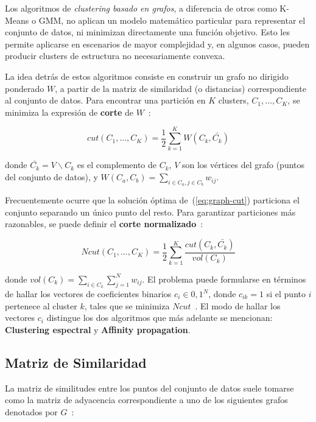Los algoritmos de \textit{clustering basado en grafos}, a diferencia de otros como K-Means o GMM, no aplican un modelo matemático particular para representar el conjunto de datos, ni minimizan directamente una función objetivo.
Esto les permite aplicarse en escenarios de mayor complejidad y, en algunos casos, pueden producir clusters de estructura no necesariamente convexa.

La idea detrás de estos algoritmos consiste en construir un grafo no dirigido ponderado $W$, a partir de la matriz de similaridad (o distancias) correspondiente al conjunto de datos.
Para encontrar una partición en $K$ clusters, $C_1,\dots,C_K$, se minimiza la expresión de \textbf{corte} de $W$~\cite{Murphy12}:

\begin{equation}
    \label{eq:graph-cut}
    cut(C_1,\dots,C_K) = \frac{1}{2}\sum_{k=1}^{K}{W(C_k,\bar{C_k})}
\end{equation}

\noindent
donde $\bar{C_k}=V\backslash C_k$ es el complemento de $C_k$, $V$ son los vértices del grafo (puntos del conjunto de datos), y $W(C_a,C_b) = \sum_{i\in C_a, j \in C_b}{w_{ij}}$.

Frecuentemente ocurre que la solución óptima de~(\ref{eq:graph-cut}) particiona el conjunto separando un único punto del resto.
Para garantizar particiones más razonables, se puede definir el \textbf{corte normalizado}~\cite{Murphy12}:

\begin{equation}
    \label{eq:normalized-cut}
    Ncut(C_1,\dots,C_K) = \frac{1}{2}\sum_{k=1}^{K}{\frac{cut(C_k,\bar{C_k})}{vol(C_k)}}
\end{equation}

\noindent
donde $vol(C_k)=\sum_{i\in C_k}\sum_{j=1}^{N}{w_{ij}}$.
El problema puede formularse en términos de hallar los vectores de coeficientes binarios $c_i\in{0,1}^N$, donde $c_{ik} = 1$ si el punto $i$ pertenece al cluster $k$, tales que se minimiza $Ncut$~\cite{Murphy12}.
El modo de hallar los vectores $c_i$ distingue los dos algoritmos que más adelante se mencionan: \textbf{Clustering espectral} y \textbf{Affinity propagation}.

\subsection{Matriz de Similaridad}\label{subsec:matrizDeSimilaridad}

La matriz de similitudes entre los puntos del conjunto de datos suele tomarse como la matriz de adyacencia correspondiente a uno de los siguientes grafos denotados por $G$~\cite{Luxburg07,Aggarawal13}:

